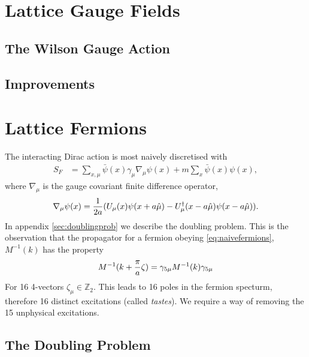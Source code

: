 \section{Lattice Gauge Fields}
\subsection{The Wilson Gauge Action}
\subsection{Improvements}
\section{Lattice Fermions}

The interacting Dirac action is most naively discretised with
\begin{align}
 S_F &= \sum_{x,\mu} \bar{\psi}(x) \gamma_{\mu} \nabla_{\mu} \psi(x) + m\sum_x \bar{\psi}(x) \psi(x),
 \label{eq:naivefermions}
\end{align}
where $\nabla_{\mu}$ is the gauge covariant finite difference operator,
\begin{align}	
	\nabla_{\mu} \psi(x) = {1\over 2a} ( U_{\mu} (x) \psi(x+a\hat{\mu}) - U^{\dagger}_{\mu}(x-a\hat{\mu})\psi(x-a\hat{\mu}) ).
\label{eq:lat_derivative}
\end{align}
In appendix \ref{sec:doublingprob} we describe the doubling problem. This is the observation that the propagator for a fermion obeying \eqref{eq:naivefermions}, $M^{-1}(k)$ has the property
\begin{align}
	M^{-1}(k+{\pi\over a}\zeta) = \gamma_{5\mu} M^{-1}(k) \gamma_{5\mu}
\end{align}
For 16 4-vectors $\zeta_{\mu} \in \mathbb{Z}_2$. This leads to 16 poles in the fermion specturm, therefore 16 distinct excitations (called \textit{tastes}). We require a way of removing the 15 unphysical excitations.


\subsection{The Doubling Problem}


